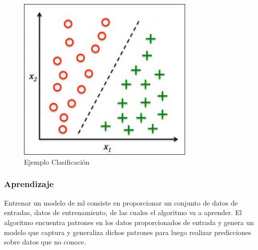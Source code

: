 \begin{figure}[H] \centering
  \includegraphics[height=8cm,keepaspectratio=true,clip=true]{imagenes/MarcoTeorico/classification.jpg}
  \caption{Ejemplo Clasificación}\label{Fig:clasificacion}
\end{figure}



\subsubsection{Aprendizaje}\label{sub:aprendizaje}
Entrenar un modelo de \ac{ml} consiste en proporcionar un conjunto de datos de entradas, datos de entrenamiento, de las cuales el algoritmo va a aprender. El algoritmo encuentra patrones en los datos proporcionados de entrada y genera un modelo que captura y generaliza dichos patrones para luego realizar predicciones sobre datos que no conoce.

